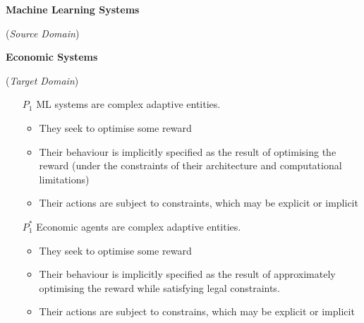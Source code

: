 \documentclass{amsart}
\theoremstyle{indented}
\theoremstyle{indentedProp}
\theoremstyle{indented}
\theoremstyle{indented}
\theoremstyle{indented}
\theoremstyle{indented}
\theoremstyle{indented}
\begin{document}
\begin{table}[htb!]
    \footnotesize 
    \begin{multicols}{2}
        {\bf Machine Learning Systems}
    
        ({\it Source Domain})
    
        \columnbreak
    
        {\bf Economic Systems}
    
        ({\it Target Domain})    
    \end{multicols}
    
    \begin{multicols}{2}
        \begin{enumerate}
            \item[$P_{1}$] ML systems are complex adaptive entities.
            \begin{itemize}
                \item They seek to optimise some reward
                \item Their behaviour is implicitly specified as the result of optimising the reward (under the constraints of their architecture and computational limitations)
                \item Their actions are subject to constraints, which may be explicit or implicit
            \end{itemize}
        \end{enumerate}
    
    \columnbreak
    
        \begin{enumerate}
        \item[$P^{*}_{1}$] Economic agents are complex adaptive entities.
        \begin{itemize}
            \item They seek to optimise some reward
            \item Their behaviour is implicitly specified as the result of approximately optimising the reward while satisfying legal constraints.
            \item Their actions are subject to constrains, which may be explicit or implicit
        \end{itemize}
    \end{enumerate}
\end{multicols}


\end{table}
\end{document}
